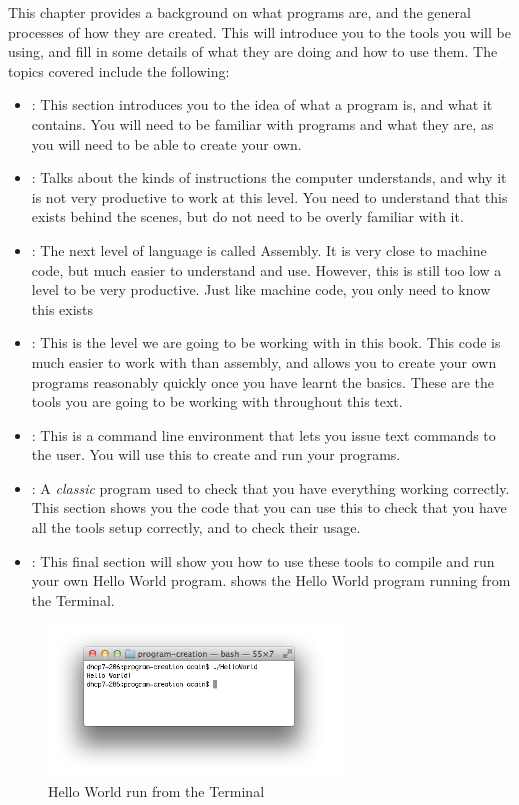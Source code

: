 This chapter provides a background on what programs are, and the general processes of how they are created. This will introduce you to the tools you will be using, and fill in some details of what they are doing and how to use them. The topics covered include the following:
\begin{itemize}
  \item {}: This section introduces you to the idea of what a program is, and what it contains. You will need to be familiar with programs and what they are, as you will need to be able to create your own.
  \item {}: Talks about the kinds of instructions the computer understands, and why it is not very productive to work at this level. You need to understand that this exists behind the scenes, but do not need to be overly familiar with it.
  \item {}: The next level of language is called Assembly. It is very close to machine code, but much easier to understand and use. However, this is still too low a level to be very productive. Just like machine code, you only need to know this exists
  \item {}: This is the level we are going to be working with in this book. This code is much easier to work with than assembly, and allows you to create your own programs reasonably quickly once you have learnt the basics. These are the tools you are going to be working with throughout this text.
  \item {}: This is a command line environment that lets you issue text commands to the user. You will use this to create and run your programs.
  \item {}: A \emph{classic} program used to check that you have everything working correctly. This section shows you the code that you can use this to check that you have all the tools setup correctly, and to check their usage.
  \item {}: This final section will show you how to use these tools to compile and run your own Hello World program.  shows the Hello World program running from the Terminal.
\end{itemize}

\begin{figure}[b]
   \centering
   \includegraphics[width=0.7\textwidth]{./topics/programs-and-compilers/images/HelloWorld} 
   \caption{Hello World run from the Terminal}
   \label{fig:run-1-helloworld}
\end{figure}


